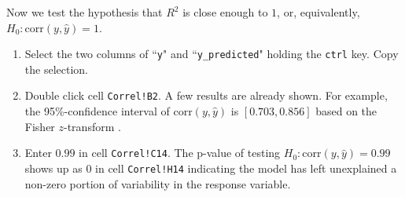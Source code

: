 \documentclass[article]{jss}
\numberwithin{equation}{subsection}
\begin{document}
        Now we test the hypothesis that $R^2$ is close enough to $1$, or, equivalently, $H_0: \textrm{corr} (y, \hat y) = 1$.
        \begin{enumerate}
          \item Select the two columns of ``\texttt{y}" and ``\texttt{y\_predicted}" holding the \texttt{ctrl} key. Copy the selection.
          \item Double click cell \texttt{Correl!B2}. 
          A few results are already shown. For example, the 95\%-confidence interval of $\textrm{corr} (y, \hat y)$ is $[0.703,0.856]$ based on the Fisher $z$-transform \citep{Fisherztransform1915}.
          \item Enter $0.99$ in  cell \texttt{Correl!C14}. The p-value of testing $H_0: \textrm{corr} (y, \hat y) = 0.99$ shows up as 0 in cell \texttt{Correl!H14} indicating the model has left unexplained a non-zero portion of variability in the response variable.
        \end{enumerate}
        
\end{document}
